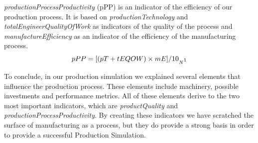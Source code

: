 \textit{productionProcessProductivity} (pPP) is an indicator of the efficiency of our production  process. It is based on \textit{productionTechnology} and \textit{totalEngineerQualityOfWork} as indicators of the quality of the process and \textit{manufactureEfficiency} as an indicator of the efficiency of the manufacturing process.
\begin{equation}
pPP= [(pT + tEQOW) \times mE]/10_{N\footnotemark}
\label{eq:PPP}
\end{equation}
 
To conclude, in our production simulation we explained several elements that influence the production process. These elements include machinery, possible investments and performance metrics. All of these elements derive to the two most important indicators, which are \textit{productQuality} and \textit{productionProcessProductivity}. By creating these indicators we have scratched the surface of manufacturing as a process, but they do provide a strong basis in order to provide a successful Production Simulation. 